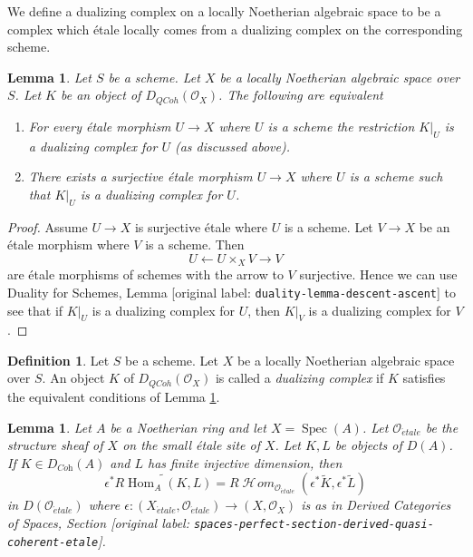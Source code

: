 \documentclass[10pt,a4paper]{article}
\theoremstyle{plain}
\newtheorem{lemma}[subsection]{Lemma}
\theoremstyle{definition}
\newtheorem{definition}[subsection]{Definition}
\theoremstyle{remark}
\numberwithin{equation}{subsection}
\def\Spec{\mathop{\mathrm{Spec}}}
\def\Hom{\mathop{\mathrm{Hom}}\nolimits}
\def\SheafHom{\mathop{\mathcal{H}\!\mathit{om}}\nolimits}
\def\etale{{\acute{e}tale}}
\def\QCoh{\mathit{QCoh}}
\begin{document}
\medskip\noindent
We define a dualizing complex on a locally Noetherian algebraic space
to be a complex which \'etale locally comes from a dualizing
complex on the corresponding scheme.

\begin{lemma}
\label{lemma-equivalent-definitions}
Let $S$ be a scheme. Let $X$ be a locally Noetherian algebraic space over $S$.
Let $K$ be an object of $D_\QCoh(\mathcal{O}_X)$. The following are equivalent
\begin{enumerate}
\item For every \'etale morphism $U \to X$ where $U$ is a scheme
the restriction $K|_U$ is a dualizing complex for $U$ (as discussed above).
\item There exists a surjective \'etale morphism $U \to X$ where $U$ is a
scheme such that $K|_U$ is a dualizing complex for $U$.
\end{enumerate}
\end{lemma}

\begin{proof}
Assume $U \to X$ is surjective \'etale where $U$ is a scheme.
Let $V \to X$ be an \'etale morphism where $V$ is a scheme.
Then
$$
U \leftarrow U \times_X V \rightarrow V
$$
are \'etale morphisms of schemes with the arrow to $V$ surjective.
Hence we can use Duality for Schemes, Lemma \textnormal{[original label: \nolinkurl{duality-lemma-descent-ascent}]}
to see that if $K|_U$ is a dualizing complex for $U$, then
$K|_V$ is a dualizing complex for $V$.
\end{proof}

\begin{definition}
\label{definition-dualizing-scheme}
Let $S$ be a scheme.
Let $X$ be a locally Noetherian algebraic space over $S$.
An object $K$ of $D_\QCoh(\mathcal{O}_X)$ is called a
{\it dualizing complex} if $K$ satisfies the equivalent conditions of
Lemma \ref{lemma-equivalent-definitions}.
\end{definition}

\begin{lemma}
\label{lemma-affine-duality}
Let $A$ be a Noetherian ring and let $X = \Spec(A)$. Let
$\mathcal{O}_\etale$ be the structure sheaf of $X$ on the
small \'etale site of $X$. Let $K, L$ be objects of $D(A)$.
If $K \in D_{\textit{Coh}}(A)$ and $L$ has finite injective
dimension, then
$$
\epsilon^*\widetilde{R\Hom_A(K, L)} =
R\SheafHom_{\mathcal{O}_\etale}(\epsilon^*\widetilde{K},
\epsilon^*\widetilde{L})
$$
in $D(\mathcal{O}_\etale)$ where
$\epsilon : (X_\etale, \mathcal{O}_\etale) \to (X, \mathcal{O}_X)$
is as in Derived Categories of Spaces, Section
\textnormal{[original label: \nolinkurl{spaces-perfect-section-derived-quasi-coherent-etale}]}.
\end{lemma}
\end{document}
